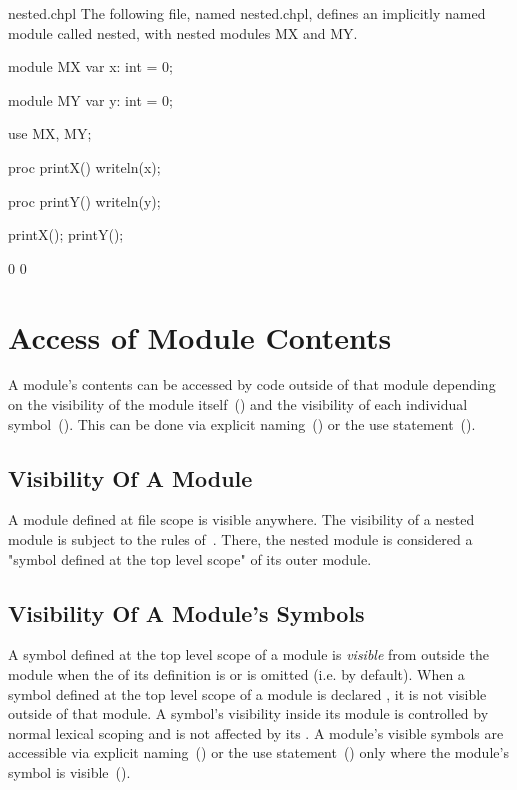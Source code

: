 \begin{chapelexample}{nested.chpl}
The following file, named nested.chpl, defines an
implicitly named module called nested, with nested modules
MX and MY.
\begin{chapel}
module MX {
  var x: int = 0;
}

module MY {
  var y: int = 0;
}

use MX, MY;

proc printX() {
  writeln(x);
}

proc printY() {
  writeln(y);
}
\end{chapel}
\begin{chapelpost}
printX();
printY();
\end{chapelpost}
\begin{chapeloutput}
0
0
\end{chapeloutput}
\end{chapelexample}


\section{Access of Module Contents}
\label{Access_Of_Module_Contents}

A module's contents can be accessed by code outside of that module
depending on the visibility of the module
itself~() and the visibility of each
individual symbol~().  This can be done
via explicit naming~() or the use
statement~().

\subsection{Visibility Of A Module}
\label{Visibility_Of_A_Module}

A module defined at file scope is visible anywhere. The visibility of a nested
module is subject to the rules of~. There,
the nested module is considered a "symbol defined at the top level
scope" of its outer module.

\subsection{Visibility Of A Module's Symbols}
\label{Visibility_Of_Symbols}

A symbol defined at the top level scope of a module is \emph{visible}
from outside the module when the  of its
definition is  or is omitted (i.e. by default). When a
symbol defined at the top level scope of a module is declared
, it is not visible outside of that module. A
symbol's visibility inside its module is controlled by normal lexical
scoping and is not affected by its .  A
module's visible symbols are accessible via explicit
naming~() or the use
statement~() only where the module's symbol is
visible~().

